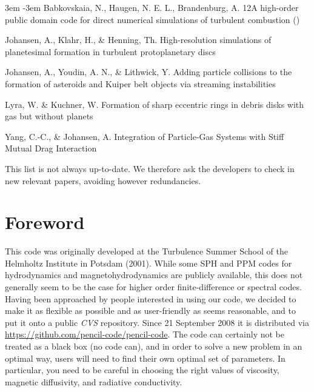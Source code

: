 \documentclass[\mydriver,12pt,twoside,notitlepage,a4paper]{article}
\makeatletter
\newcommand{\name}[2][]{%
  \def\index@{#1}%
  \textsl{#2\/}%
  \ifx\index@\@empty\index{#2@\MakeUppercase #2}%
  \else\index{#1}%
  \fi%
}
\makeatother
\begin{document}
\begin{list}{}{\leftmargin 3em \itemindent -3em\listparindent \itemindent
\itemsep 0pt \parsep 1pt}
Babkovskaia, N., Haugen, N. E. L., Brandenburg, A.
{12}{A high-order public domain code for direct numerical simulations of turbulent combustion}
()

Johansen, A., Klahr, H., \& Henning, Th.
{High-resolution simulations of planetesimal formation in turbulent protoplanetary discs}

Johansen, A., Youdin, A. N., \& Lithwick, Y.
{Adding particle collisions to the formation of asteroids and Kuiper belt objects via streaming instabilities}

Lyra, W. \& Kuchner, W. 
{Formation of sharp eccentric rings in debris disks with gas but without planets}

Yang, C.-C., \& Johansen, A.
{Integration of Particle-Gas Systems with Stiff Mutual Drag Interaction}

\end{list}
This list is not always up-to-date.
We therefore ask the developers to check in new relevant papers,
avoiding however redundancies.
\clearpage


\section*{Foreword}

This code was originally developed at the Turbulence Summer School of the
Helmholtz Institute in Potsdam (2001).
While some SPH and PPM codes for hydrodynamics and magnetohydrodynamics
are publicly available, this does not generally seem to be
the case for higher order finite-difference or spectral codes.
Having been approached by people interested in using our code, we
decided to make it as flexible as possible and as user-friendly as seems
reasonable, and to put it onto a public \name{CVS} repository.
Since 21 September 2008 it is distributed via
\url{https://github.com/pencil-code/pencil-code}.
The code can certainly not be treated as a black box (no code can), and in
order to solve a new problem in an optimal way, users will need to find their
own optimal set of parameters.
In particular, you need to be careful in choosing
the right values of viscosity, magnetic diffusivity, and radiative
conductivity.
\end{document}
